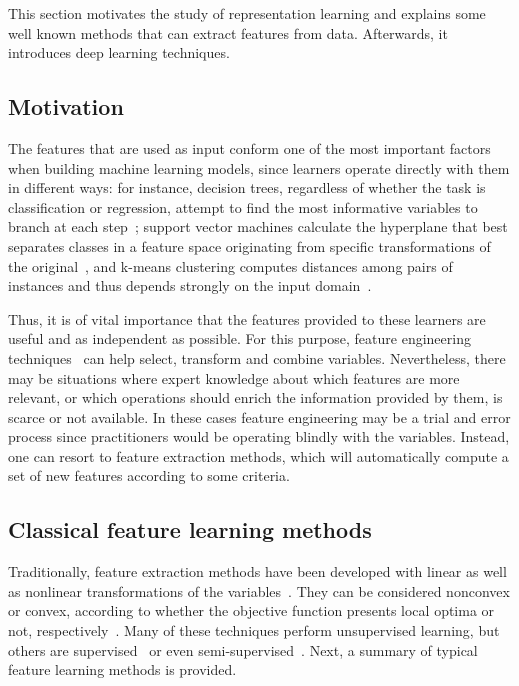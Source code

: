 This section motivates the study of representation learning and explains some well known methods that can extract features from data. Afterwards, it introduces deep learning techniques.

\subsection{Motivation}

The features that are used as input conform one of the most important factors when building machine learning models, since learners operate directly with them in different ways: for instance, decision trees, regardless of whether the task is  classification or regression, attempt to find the most informative variables to branch at each step~\cite{kotsiantis2007supervised}; support vector machines calculate the hyperplane that best separates classes in a feature space originating from specific transformations of the original~\cite{kotsiantis2007supervised}, and k-means clustering computes distances among pairs of instances and thus depends strongly on the input domain~\cite{Jain1999DataCA}.

Thus, it is of vital importance that the features provided to these learners are useful and as independent as possible. For this purpose, feature engineering techni\-ques~\cite{domingos-useful} can help select, transform and combine variables. Nevertheless, there may be situations where expert knowledge about which features are more relevant, or which operations should enrich the information provided by them, is scarce or not available. In these cases feature engineering may be a trial and error process since practitioners would be operating blindly with the variables. Instead, one can resort to feature extraction methods, which will automatically compute a set of new features according to some criteria.


\subsection{Classical feature learning methods}

Traditionally, feature extraction methods have been developed with linear as well as nonlinear transformations of the variables~\cite{featext}. They can be considered nonconvex or convex, according to whether the objective function presents local optima or not, respectively~\cite{DimRecComparative}. Many of these techniques perform unsupervised learning, but others are supervised~\cite{FisherLDA,lds,adv} or even semi-supervised~\cite{lsss}. Next, a summary of typical feature learning methods is provided.

